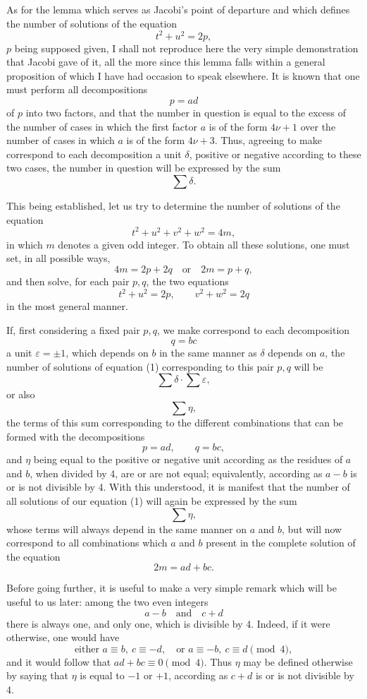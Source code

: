 \documentclass[11pt]{article}
\begin{document}
As for the lemma which serves as Jacobi's point of departure and which defines the number of solutions of the equation
\[
t^2+u^2=2p,
\]
\(p\) being supposed given, I shall not reproduce here the very simple demonstration that Jacobi gave of it, all the more since this lemma falls within a general proposition of which I have had occasion to speak elsewhere. It is known that one must perform all decompositions
\[
p=ad
\]
of \(p\) into two factors, and that the number in question is equal to the excess of the number of cases in which the first factor \(a\) is of the form \(4\nu+1\) over the number of cases in which \(a\) is of the form \(4\nu+3\). Thus, agreeing to make correspond to each decomposition a unit \(\delta\), positive or negative according to these two cases, the number in question will be expressed by the sum
\[
\sum\delta.
\]

This being established, let us try to determine the number of solutions of the equation
\[
\tag{1} t^2+u^2+v^2+w^2=4m,
\]
in which \(m\) denotes a given odd integer. To obtain all these solutions, one must set, in all possible ways,
\[
4m=2p+2q\quad\text{or}\quad 2m=p+q,
\]
and then solve, for each pair \(p,q\), the two equations
\[
t^2+u^2=2p,\qquad v^2+w^2=2q
\]
in the most general manner.

If, first considering a fixed pair \(p,q\), we make correspond to each decomposition
\[
q=bc
\]
a unit \(\varepsilon=\pm1\), which depends on \(b\) in the same manner as \(\delta\) depends on \(a\), the number of solutions of equation (1) corresponding to this pair \(p,q\) will be
\[
\sum\delta\cdot\sum\varepsilon,
\]
or also
\[
\sum\eta,
\]
the terms of this sum corresponding to the different combinations that can be formed with the decompositions
\[
p=ad,\qquad q=bc,
\]
and \(\eta\) being equal to the positive or negative unit according as the residues of \(a\) and \(b\), when divided by 4, are or are not equal; equivalently, according as \(a-b\) is or is not divisible by 4. With this understood, it is manifest that the number of all solutions of our equation (1) will again be expressed by the sum
\[
\sum\eta,
\]
whose terms will always depend in the same manner on \(a\) and \(b\), but will now correspond to all combinations which \(a\) and \(b\) present in the complete solution of the equation
\[
\tag{2} 2m=ad+bc.
\]

Before going further, it is useful to make a very simple remark which will be useful to us later: among the two even integers
\[
a-b\quad\text{and}\quad c+d
\]
there is always one, and only one, which is divisible by 4. Indeed, if it were otherwise, one would have
\[
\text{either } a\equiv b,\ c\equiv -d,\quad
\text{or } a\equiv -b,\ c\equiv d \pmod{4},
\]
and it would follow that \(ad+bc\equiv0\pmod{4}\). Thus \(\eta\) may be defined otherwise by saying that \(\eta\) is equal to \(-1\) or \(+1\), according as \(c+d\) is or is not divisible by 4.
\end{document}
